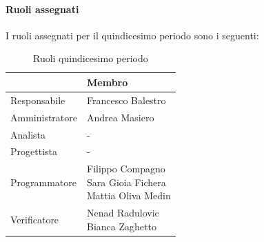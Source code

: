 \documentclass[a4paper,12pt]{article}
\begin{document}
            \paragraph{Ruoli assegnati}
            I ruoli assegnati per il quindicesimo periodo sono i seguenti:
                \begin{table}[H]
                \centering
                \caption{Ruoli quindicesimo periodo}
                \begin{tabular}{|l|l|}
                \hline
                    \rowcolor{lightgray}{\textbf{Ruolo}} & {\textbf{Membro}} \\
                \hline
                    Responsabile & Francesco Balestro \\
                \hline
                    Amministratore & Andrea Masiero \\
                \hline
                    Analista & - \\
                \hline
                    Progettista & - \\
                \hline
                    Programmatore & \makecell[l]{ Filippo Compagno \\ Sara Gioia Fichera \\ Mattia Oliva Medin } \\
                \hline
                    Verificatore & \makecell[l]{ Nenad Radulovic \\ Bianca Zaghetto } \\
                \hline
                \end{tabular}
                \end{table}
                
\end{document}

